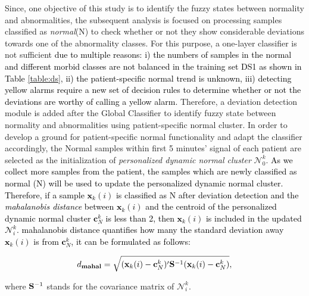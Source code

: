 Since, one objective of this study is to identify the fuzzy states between normality and abnormalities, the subsequent analysis is focused on processing samples classified as \textit{normal}(N) 
to check whether or not they show considerable deviations towards one of the abnormality classes. For this purpose, a one-layer classifier is not sufficient \textcolor{black}{due to multiple reasons: i) the numbers of samples in the normal and different morbid classes are not balanced in the training set DS1 as shown in Table \ref{table:ds}, ii) the patient-specific normal trend is unknown, iii) detecting yellow alarms require a new set of decision rules to determine whether or not the deviations are worthy of calling a yellow alarm.} Therefore, a deviation detection module is added after the Global Classifier to identify fuzzy state between normality and abnormalities %
using patient-specific normal cluster. In order to develop a ground for patient-specific normal functionality and adapt the classifier accordingly, the Normal samples within first 5 minutes' signal of each patient are selected as the initialization of \textit{personalized dynamic normal cluster} $\mathcal{N}_0^k$. \textcolor{black}{As we collect more samples from the patient, the samples which are newly classified as normal (N) will be used to update the personalized dynamic normal cluster. Therefore, if a sample $\mathbf{x}_k(i)$ is classified as N after deviation detection and the \textit{mahalanobis distance} between $\mathbf{x}_k(i)$ and the centroid of the personalized dynamic normal cluster $\mathbf{c}^k_N$ is less than 2, then $\mathbf{x}_k(i)$ is included in the updated $\mathcal{N}_i^k$. mahalanobis distance quantifies how many the standard deviation away $\mathbf{x}_k(i)$ is from $\mathbf{c}^k_N$, it can be formulated as follows:}

\begin{align}
d_{\mathbf{mahal}} = \sqrt{ (\mathbf{x}_k(i)- \mathbf{c}^k_N)' {\rm \bf S}^{-1} (\mathbf{x}_k(i) - \mathbf{c}^k_N) },
\end{align}

where ${\rm \bf S}^{-1}$ stands for the covariance matrix of $\mathcal{N}_i^k$.


